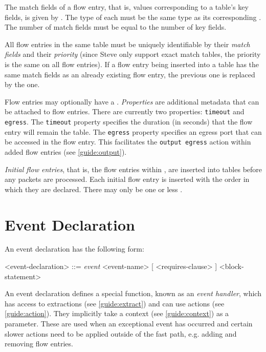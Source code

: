The match fields of a flow entry, that is, values corresponding to a table's key fields, is given by . The type of each  must be the same type as its corresponding . The number of match fields must be equal to the number of key fields.

All flow entries in the same table must be uniquely identifiable by their \textit{match fields} and their \textit{priority} (since Steve only support exact match tables, the priority is the same on all flow entries). If a flow entry being inserted into a table has the same match fields as an already existing flow entry, the previous one is replaced by the one.

Flow entries may optionally have a . \textit{Properties} are additional metadata that can be attached to flow entries. There are currently two properties: \texttt{timeout} and \texttt{egress}. The \texttt{timeout} property specifies the duration (in seconds) that the flow entry will remain the table. The \texttt{egress} property specifies an egress port that can be accessed in the flow entry. This facilitates the \texttt{output egress} action within added flow entries (see \ref{guide:output}).

\textit{Initial flow entries}, that is, the flow entries within , are inserted into tables before any packets are processed. Each initial flow entry is inserted with the order in which they are declared. There may only be one or less .

\section{Event Declaration} \label{guide:event}

An event declaration has the following form:

\begin{minip}
\begin{grammar}
<event-declaration> ::=
\textit{event} <event-name> [ <requires-clause> ]
<block-statement>
\end{grammar}
\end{minip}

An event declaration defines a special function, known as an \textit{event handler}, which has access to extractions (see \ref{guide:extract}) and can use actions (see \ref{guide:action}). They implicitly take a context (see \ref{guide:context}) as a parameter. These are used when an exceptional event has occurred and certain slower actions need to be applied outside of the fast path, e.g. adding and removing flow entries.

